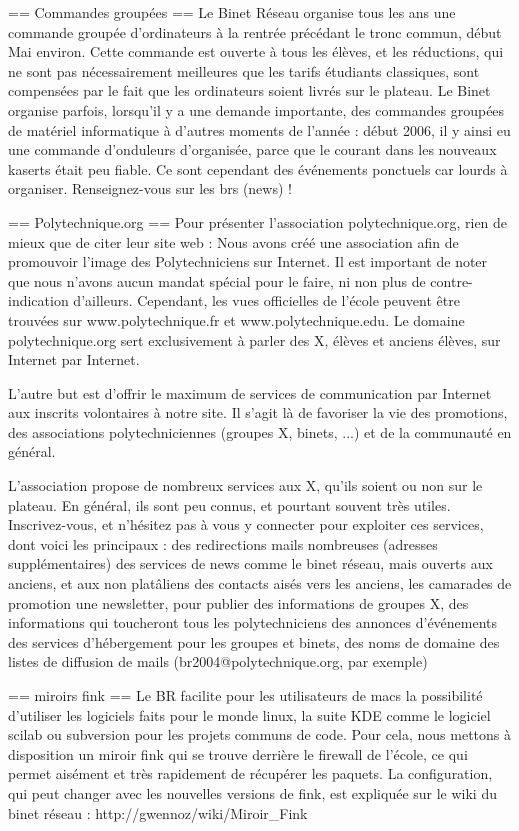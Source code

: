 == Commandes groupées ==
Le Binet Réseau organise tous les ans une commande groupée d'ordinateurs à la rentrée
précédant le tronc commun, début Mai environ. Cette commande est ouverte à tous les élèves,
et les réductions, qui ne sont pas nécessairement meilleures que les tarifs étudiants
classiques, sont compensées par le fait que les ordinateurs soient livrés sur le plateau.
Le Binet organise parfois, lorsqu'il y a une demande importante, des commandes groupées
de matériel informatique à d'autres moments de l'année : début 2006, il y ainsi eu une
commande d'onduleurs d'organisée, parce que le courant dans les nouveaux kaserts était
peu fiable. Ce sont cependant des événements ponctuels car lourds à organiser.
Renseignez-vous sur les brs (news) !

== Polytechnique.org ==
Pour présenter l'association polytechnique.org, rien de mieux que de citer leur site web :
  Nous avons créé une association afin de promouvoir l'image des Polytechniciens sur Internet.
  Il est important de noter que nous n'avons aucun mandat spécial pour le faire, ni non plus
  de contre-indication d'ailleurs. Cependant, les vues officielles de l'école peuvent être
  trouvées sur www.polytechnique.fr et www.polytechnique.edu. Le domaine polytechnique.org sert
  exclusivement à parler des X, élèves et anciens élèves, sur Internet par Internet.

  L'autre but est d'offrir le maximum de services de communication par Internet aux inscrits
  volontaires à notre site. Il s'agit là de favoriser la vie des promotions, des associations
  polytechniciennes (groupes X, binets, ...) et de la communauté en général.

L'association propose de nombreux services aux X, qu'ils soient ou non sur le plateau.
En général, ils sont peu connus, et pourtant souvent très utiles. Inscrivez-vous, et n'hésitez
pas à vous y connecter pour exploiter ces services, dont voici les principaux :
  des redirections mails nombreuses (adresses supplémentaires)
  des services de news comme le binet réseau, mais ouverts aux anciens, et aux non platâliens
  des contacts aisés vers les anciens, les camarades de promotion
  une newsletter, pour publier des informations de groupes X, des informations qui toucheront tous les polytechniciens
  des annonces d'événements
  des services d'hébergement pour les groupes et binets, des noms de domaine
  des listes de diffusion de mails (br2004@polytechnique.org, par exemple)

== miroirs fink == 
Le BR facilite pour les utilisateurs de macs la possibilité d'utiliser les logiciels faits pour le monde linux, la suite KDE comme le logiciel scilab ou subversion pour les projets communs de code. Pour cela, nous mettons à disposition un miroir fink qui se trouve derrière le firewall de l'école, ce qui permet aisément et très rapidement de récupérer les paquets. La configuration, qui peut changer avec les nouvelles versions de fink, est expliquée sur le wiki du binet réseau : 
http://gwennoz/wiki/Miroir_Fink